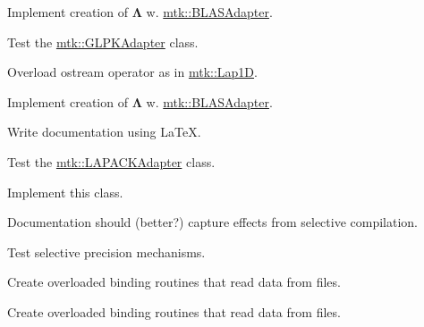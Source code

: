 \begin{DoxyRefList}
Implement creation of $ \mathbf{\Lambda}$ w. \hyperlink{classmtk_1_1BLASAdapter}{mtk\+::\+B\+L\+A\+S\+Adapter}.  
\item[\label{todo__todo000027}%
\hypertarget{todo__todo000027}{}%
File \hyperlink{mtk__glpk__adapter__test_8cc}{mtk\+\_\+glpk\+\_\+adapter\+\_\+test.cc} ]Test the \hyperlink{classmtk_1_1GLPKAdapter}{mtk\+::\+G\+L\+P\+K\+Adapter} class.  
\item[\label{todo__todo000020}%
\hypertarget{todo__todo000020}{}%
File \hyperlink{mtk__grad__1d_8cc}{mtk\+\_\+grad\+\_\+1d.cc} ]Overload ostream operator as in \hyperlink{classmtk_1_1Lap1D}{mtk\+::\+Lap1\+D}.

Implement creation of $ \mathbf{\Lambda}$ w. \hyperlink{classmtk_1_1BLASAdapter}{mtk\+::\+B\+L\+A\+S\+Adapter}.  
\item[\label{todo__todo000022}%
\hypertarget{todo__todo000022}{}%
File \hyperlink{mtk__lapack__adapter_8cc}{mtk\+\_\+lapack\+\_\+adapter.cc} ]Write documentation using La\+Te\+X. 
\item[\label{todo__todo000028}%
\hypertarget{todo__todo000028}{}%
File \hyperlink{mtk__lapack__adapter__test_8cc}{mtk\+\_\+lapack\+\_\+adapter\+\_\+test.cc} ]Test the \hyperlink{classmtk_1_1LAPACKAdapter}{mtk\+::\+L\+A\+P\+A\+C\+K\+Adapter} class.  
\item[\label{todo__todo000003}%
\hypertarget{todo__todo000003}{}%
File \hyperlink{mtk__quad__1d_8h}{mtk\+\_\+quad\+\_\+1d.h} ]Implement this class.  
\item[\label{todo__todo000004}%
\hypertarget{todo__todo000004}{}%
File \hyperlink{mtk__roots_8h}{mtk\+\_\+roots.h} ]Documentation should (better?) capture effects from selective compilation.

Test selective precision mechanisms.  
\item[\label{todo__todo000006}%
\hypertarget{todo__todo000006}{}%
File \hyperlink{mtk__uni__stg__grid__1d_8h}{mtk\+\_\+uni\+\_\+stg\+\_\+grid\+\_\+1d.h} ]Create overloaded binding routines that read data from files.  
\item[\label{todo__todo000009}%
\hypertarget{todo__todo000009}{}%
File \hyperlink{mtk__uni__stg__grid__2d_8h}{mtk\+\_\+uni\+\_\+stg\+\_\+grid\+\_\+2d.h} ]Create overloaded binding routines that read data from files. 
\end{DoxyRefList}